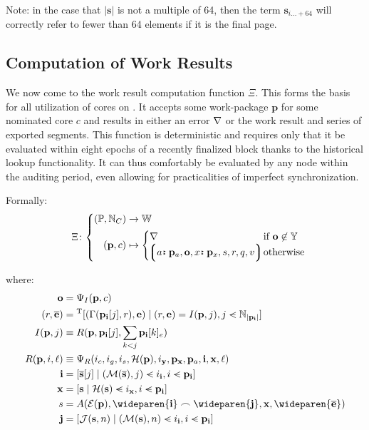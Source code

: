 Note: in the case that $|\mathbf{s}|$ is not a multiple of 64, then the term $\mathbf{s}_{i\dots+64}$ will correctly refer to fewer than 64 elements if it is the final page.

\subsection{Computation of Work Results}\label{sec:computeworkresult}

We now come to the work result computation function $\Xi$. This forms the basis for all utilization of cores on \Jam. It accepts some work-package $\mathbf{p}$ for some nominated core $c$ and results in either an error $\nabla$ or the work result and series of exported segments. This function is deterministic and requires only that it be evaluated within eight epochs of a recently finalized block thanks to the historical lookup functionality. It can thus comfortably be evaluated by any node within the auditing period, even allowing for practicalities of imperfect synchronization.

Formally:
\begin{equation}\label{eq:workresultfunction}
  \!\!\Xi \colon \left\{\begin{aligned}
    (\mathbb{P}, \N_C) &\to \mathbb{W} \\
    (\mathbf{p}, c) &\mapsto \begin{cases}
        \error &\when \mathbf{o} \not\in \Y \\
        \tup{\is{a}{\mathbf{p}_a}, \mathbf{o}, \is{x}{\mathbf{p}_x}, s, r, q, v} \!\!\!\!\!&\otherwise
    \end{cases}
  \end{aligned}\right.\!\!\!\!\!\!\!
\end{equation}

where:
\begin{align*}
  \mathbf{o} &= \Psi_I(\mathbf{p}, c) \\
  (r, \overline{\mathbf{e}}) &= \transpose[(\Gamma(\mathbf{p}_\mathbf{i}[j], r), \mathbf{e}) \mid (r, \mathbf{e}) = I(\mathbf{p}, j), j \orderedin \N_{|\mathbf{p}_\mathbf{i}|}] \\
  I(\mathbf{p}, j) &\equiv R(\mathbf{p}, \mathbf{p}_\mathbf{i}[j], \sum_{k < j}\mathbf{p}_\mathbf{i}[k]_e)\\
  R(\mathbf{p}, i, \ell) &\equiv \Psi_R(i_c, i_g, i_s, \mathcal{H}(\mathbf{p}), i_\mathbf{y}, \mathbf{p}_\Tcontext, \mathbf{p}_a, \mathbf{i}, \mathbf{x}, \ell)\\
  \mathbf{i} &= [\overline{\mathbf{s}}[j] \mid (\mathcal{M}(\overline{\mathbf{s}}), j) \orderedin i_\mathbf{i}, i \orderedin \mathbf{p}_\mathbf{i}]\\
  \mathbf{x} &= [\mathbf{s} \mid \mathcal{H}(\mathbf{s}) \orderedin i_\mathbf{x}, i \orderedin \mathbf{p}_\mathbf{i}]\\
  s &= A(\se(\mathbf{p}), \wideparen{\mathbf{i}} \frown \wideparen{\mathbf{j}}, \mathbf{x}, \wideparen{\overline{\mathbf{e}}}) \\
  \mathbf{j} &= [\mathcal{J}(\mathbf{s}, n) \mid (\mathcal{M}(\mathbf{s}), n) \orderedin i_\mathbf{i}, i \orderedin \mathbf{p}_\mathbf{i}]
\end{align*}

